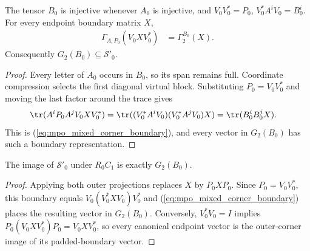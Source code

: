 \begin{lemma}
    \label{thm:mpo_mixed_first_support}
    \leanok
    The tensor $B_0$ is injective whenever $A_0$ is injective, and
    $V_0V_0^*=P_0$, $V_0^*A^iV_0=B_0^i$.
    For every endpoint boundary matrix $X$,
    \begin{align}
        \Gamma_{A,P_0}(V_0XV_0^*) & =\Gamma^{B_0}_2(X).
        \label{eq:mpo_mixed_corner_boundary}
    \end{align}
    Consequently $G_2(B_0)\subseteq\mathcal S'_0$.
\end{lemma}
\begin{proof}
    \leanok
    Every letter of $A_0$ occurs in $B_0$, so its span remains full.
    Coordinate compression selects the first diagonal virtual block.
    Substituting $P_0=V_0V_0^*$ and moving the last factor around the
    trace gives
    \begin{align}
        \tr(A^iP_0A^jV_0XV_0^*)
         & =\tr((V_0^*A^iV_0)(V_0^*A^jV_0)X)
        =\tr(B_0^iB_0^jX).
    \end{align}
    This is (\ref{eq:mpo_mixed_corner_boundary}), and every vector in
    $G_2(B_0)$ has such a boundary representation.
\end{proof}

\begin{lemma}
    \label{thm:mpo_mixed_corner_support}
    \leanok
    The image of $\mathcal S'_0$ under $R_0C_1$ is exactly $G_2(B_0)$.
\end{lemma}
\begin{proof}
    \leanok
    Applying both outer projections replaces $X$ by $P_0XP_0$.
    Since $P_0=V_0V_0^*$, this boundary equals
    $V_0(V_0^*XV_0)V_0^*$ and (\ref{eq:mpo_mixed_corner_boundary})
    places the resulting vector in $G_2(B_0)$.
    Conversely, $V_0^*V_0=I$ implies
    $P_0(V_0XV_0^*)P_0=V_0XV_0^*$, so every canonical endpoint vector
    is the outer-corner image of its padded-boundary vector.
\end{proof}
